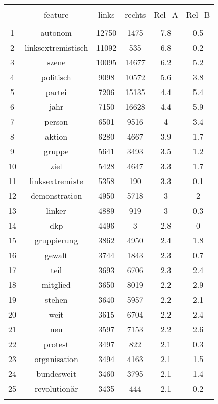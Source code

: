 
\begin{table}[!htbp] \centering 
  \caption{} 
  \label{} 
\begin{tabular}{@{\extracolsep{5pt}} cccccc} 
\\[-1.8ex]\hline 
\hline \\[-1.8ex] 
 & feature & links & rechts & Rel\_A & Rel\_B \\ 
\hline \\[-1.8ex] 
1 & autonom & 12750 & 1475 & 7.8 & 0.5 \\ 
2 & linksextremistisch & 11092 & 535 & 6.8 & 0.2 \\ 
3 & szene & 10095 & 14677 & 6.2 & 5.2 \\ 
4 & politisch & 9098 & 10572 & 5.6 & 3.8 \\ 
5 & partei & 7206 & 15135 & 4.4 & 5.4 \\ 
6 & jahr & 7150 & 16628 & 4.4 & 5.9 \\ 
7 & person & 6501 & 9516 & 4 & 3.4 \\ 
8 & aktion & 6280 & 4667 & 3.9 & 1.7 \\ 
9 & gruppe & 5641 & 3493 & 3.5 & 1.2 \\ 
10 & ziel & 5428 & 4647 & 3.3 & 1.7 \\ 
11 & linksextremiste & 5358 & 190 & 3.3 & 0.1 \\ 
12 & demonstration & 4950 & 5718 & 3 & 2 \\ 
13 & linker & 4889 & 919 & 3 & 0.3 \\ 
14 & dkp & 4496 & 3 & 2.8 & 0 \\ 
15 & gruppierung & 3862 & 4950 & 2.4 & 1.8 \\ 
16 & gewalt & 3744 & 1843 & 2.3 & 0.7 \\ 
17 & teil & 3693 & 6706 & 2.3 & 2.4 \\ 
18 & mitglied & 3650 & 8019 & 2.2 & 2.9 \\ 
19 & stehen & 3640 & 5957 & 2.2 & 2.1 \\ 
20 & weit & 3615 & 6704 & 2.2 & 2.4 \\ 
21 & neu & 3597 & 7153 & 2.2 & 2.6 \\ 
22 & protest & 3497 & 822 & 2.1 & 0.3 \\ 
23 & organisation & 3494 & 4163 & 2.1 & 1.5 \\ 
24 & bundesweit & 3460 & 3795 & 2.1 & 1.4 \\ 
25 & revolutionär & 3435 & 444 & 2.1 & 0.2 \\ 
\hline \\[-1.8ex] 
\end{tabular} 
\end{table} 
